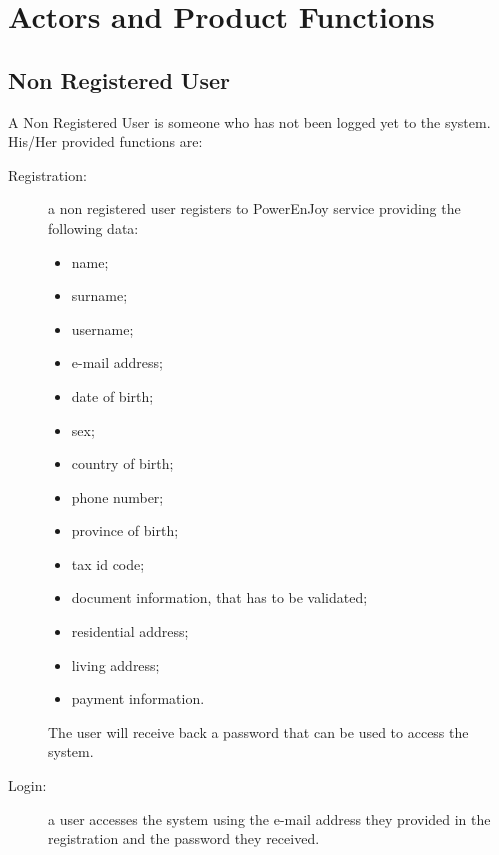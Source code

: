 \section{Actors and Product Functions}
\subsection{Non Registered User}
A Non Registered User is someone who has not been logged yet to the system. His/Her provided functions are:
\begin{description}
\item[Registration:] a non registered user registers to PowerEnJoy service providing the following data:
	\begin{itemize}
	\item name;
	\item surname;
	\item username;
	\item e-mail address;
	\item date of birth;
	\item sex;
	\item country of birth;
	\item phone number;
	\item province of birth;
	\item tax id code; %
	\item document information, that has to be validated;
	\item residential address;
	\item living address;
	\item payment information.
	\end{itemize}
	The user will receive back a password that can be used to access the system.
\item[Login:] a user accesses the system using the e-mail address they provided in the registration and the password they received.
\end{description}
